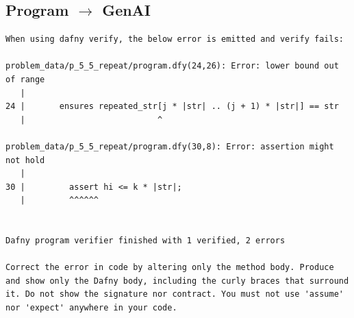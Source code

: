 \documentclass{article}
\begin{document}
\subsection*{Program $\rightarrow$ GenAI}
\begin{lstlisting}
When using dafny verify, the below error is emitted and verify fails:

problem_data/p_5_5_repeat/program.dfy(24,26): Error: lower bound out of range
   |
24 |       ensures repeated_str[j * |str| .. (j + 1) * |str|] == str
   |                           ^

problem_data/p_5_5_repeat/program.dfy(30,8): Error: assertion might not hold
   |
30 |         assert hi <= k * |str|;
   |         ^^^^^^


Dafny program verifier finished with 1 verified, 2 errors

Correct the error in code by altering only the method body. Produce and show only the Dafny body, including the curly braces that surround it. Do not show the signature nor contract. You must not use 'assume' nor 'expect' anywhere in your code.
\end{lstlisting}
\end{document}

